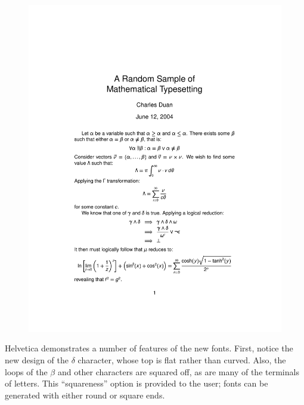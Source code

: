 \documentclass[preprint]{ltugproc}
\begin{document}
\begin{figure}
\centering
\includegraphics[trim=112.1475pt 1.5in 112.1475pt 2in]{helvetica}
\end{figure}

Helvetica demonstrates a number of features of the new fonts. First, notice the
new design of the $\delta$ character, whose top is flat rather than curved.
Also, the loops of the $\beta$ and other characters are squared off, as are many
of the terminals of letters. This ``squareness'' option is provided to the user;
fonts can be generated with either round or square ends.
\end{document}
